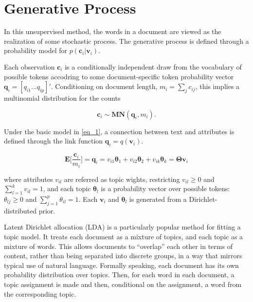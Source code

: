 \documentclass[12pt,a4paper,notitlepage]{article}
\begin{document}
\section{Generative Process}

In this unsupervised method, the words in a document are viewed as the realization of some stochastic process. The generative process is defined through a probability model for $p(\boldsymbol{c}_i|\boldsymbol{v}_i)$.

Each observation $\boldsymbol{c}_i$ is a conditionally independent draw from the vocabulary of possible tokens accodring to some document-specific token probability vector $\boldsymbol{q}_i=[q_{i1}...q_{ip}]'$. Conditioning on document length, $m_i=\sum_jc_{ij}$, this implies a multinomial distribution for the counts

\begin{equation}\label{eq_1}
	\boldsymbol{c}_i \sim \boldsymbol{MN}(\boldsymbol{q}_i,m_i). 
\end{equation}

Under the basic model in \ref{eq_1}, a connection between text and attributes is defined through the link function $\boldsymbol{q}_i=q(\boldsymbol{v}_i)$. 

\begin{equation}\label{eq_2}
	\boldsymbol{E} \bigg[\frac{\boldsymbol{c}_i}{m_i}\bigg]=\boldsymbol{q}_i =v_{i1}\boldsymbol{\theta}_1+v_{i2}\boldsymbol{\theta}_2+v_{ik}\boldsymbol{\theta}_k=\boldsymbol{\Theta v}_i
\end{equation}

where attributes $v_{il}$ are referred as topic wights, restricting $v_{il}\geq 0$ and $\sum^k_{l=1}v_{il}=1$, and each topic $\boldsymbol{\theta}_l$ is a probability vector over possible tokens: $\theta_{lj}\geq 0$ and $\sum^p_{j=1}\theta_{il}=1$. Each $\boldsymbol{v}_i$ and $\boldsymbol{\theta}_l$ is generated from a Dirichlet-distributed prior.

Latent Dirichlet allocation (LDA) is a particularly popular method for fitting a topic model. It treats each document as a mixture of topics, and each topic as a mixture of words. This allows documents to “overlap” each other in terms of content, rather than being separated into discrete groups, in a way that mirrors typical use of natural language. Formally speaking, each document has its own probability distribution over topics. Then, for each word in each document, a topic assignment is made and then, conditional on the assignment, a word from the corresponding topic. 
\end{document}
